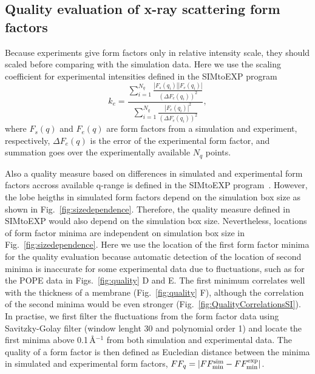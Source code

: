 \documentclass[fleqn,10pt]{wlscirep}
\begin{document}
\subsection{Quality evaluation of x-ray scattering form factors}
Because experiments give form factors only in relative intensity scale, they should scaled before comparing with the simulation data. Here we use the scaling coefficient for experimental intensities defined in the SIMtoEXP program~\cite{kucerka10}
\begin{equation}
    k_e = \frac{\sum_{i=1}^{N_q} \frac{|F_s(q_i)||F_e(q_i)|}{(\Delta F_e(q_i))^2}}{\sum_{i=1}^{N_q} \frac{|F_e(q_i)|^2}{(\Delta F_e(q_i))^2}},
\end{equation}
where $F_s(q)$ and $F_e(q)$ are form factors from a simulation and experiment, respectively, $\Delta F_e(q)$ is the error of the experimental form factor, and summation goes over the experimentally available $N_q$ points. 

Also a quality measure based on differences in simulated and experimental form factors accross available q-range is defined in the SIMtoEXP program~\cite{kucerka10}. However, the lobe heigths in simulated form factors depend on the simulation box size as shown in Fig.~\ref{fig:sizedependence}. Therefore, the quality measure defined in SIMtoEXP  would also depend on the simulation box size. Nevertheless, locations of form factor minima are independent on simulation box size in Fig.~\ref{fig:sizedependence}. Here we use the location of the first form factor minima for the quality evaluation because automatic detection of the location of second minima is inaccurate for some experimental data due to fluctuations, such as for the POPE data in Figs.~\ref{fig:quality} D and E. 
The first minimum correlates well with the thickness of a membrane (Fig.~\ref{fig:quality} F), although the correlation of the second minima would be even stronger (Fig.~\ref{fig:QualityCorrelationsSI}). In practise, we first filter the fluctuations from the form factor data using Savitzky-Golay filter (window lenght 30 and polynomial order 1) and locate the first minima above 0.1\,\AA$^{-1}$ from both simulation and experimental data. The quality of a form factor is then defined as Eucledian distance between the minima in simulated and experimental form factors, $FF_q = |FF_{\rm{min}}^{\rm{sim}}-FF_{\rm{min}}^{\rm{exp}}|$. 
\end{document}
